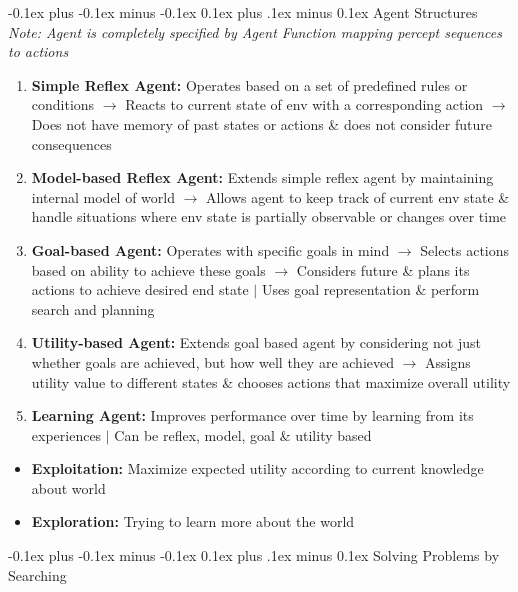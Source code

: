\documentclass[landscape]{article}
\makeatletter
\renewcommand{\section}{\@startsection{section}{1}{0mm}%
  {-0.1ex plus -0.1ex minus -0.1ex}%
  {0.1ex plus .1ex minus 0.1ex}%
{\normalfont\small\bfseries}}
\renewcommand{\subsection}{\@startsection{subsection}{2}{0mm}%
  {-0.1ex plus -0.1ex minus -0.1ex}%
  {0.1ex plus .1ex minus 0.1ex}%
{\normalfont\scriptsize\bfseries}}
\makeatother
\begin{document}
\begin{multicols*}{5}
    \subsection{Agent Structures}
    \textit{Note: Agent is completely specified by Agent Function mapping percept sequences to actions}
    \begin{enumerate}
      \item \textbf{Simple Reflex Agent:} Operates based on a set of predefined rules or conditions $\rightarrow$ Reacts to current state of env with a corresponding action $\rightarrow$ Does not have memory of past states or actions \& does not consider future consequences
      \item \textbf{Model-based Reflex Agent:} Extends simple reflex agent by maintaining internal model of world $\rightarrow$ Allows agent to keep track of current env state \& handle situations where env state is partially observable or changes over time
      \item \textbf{Goal-based Agent:} Operates with specific goals in mind $\rightarrow$ Selects actions based on ability to achieve these goals $\rightarrow$ Considers future \& plans its actions to achieve desired end state $\vert$ Uses goal representation \& perform search and planning
      \item \textbf{Utility-based Agent:} Extends goal based agent by considering not just whether goals are achieved, but how well they are achieved $\rightarrow$ Assigns utility value to different states \& chooses actions that maximize overall utility
      \item \textbf{Learning Agent:} Improves performance over time by learning from its experiences $\vert$ Can be reflex, model, goal \& utility based
    \end{enumerate}
    \begin{itemize}
      \item \textbf{Exploitation:} Maximize expected utility according to current knowledge about world
      \item \textbf{Exploration:} Trying to learn more about the world
    \end{itemize}

    \section{Solving Problems by Searching}

\end{multicols*}
\end{document}
